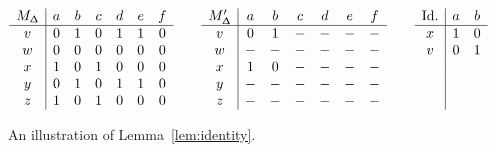 \documentclass{article}
\renewcommand{\Delta}{\Updelta}
\theoremstyle{plain}
\theoremstyle{definition}
\begin{document}
\begin{figure}[t]
       \vspace{-5pt}
       \begin{equation*}
            \begin{array}{c|cccccc}
                M_{\Delta} & a & b & c & d & e & f\\
                \hline v & 0 & 1 & 0 & 1 & 1 & 0\\
                w & 0 & 0 & 0 & 0 & 0 & 0\\
                x & 1 & 0 & 1 & 0 & 0 & 0\\
                y & 0 & 1 & 0 & 1 & 1 & 0\\
                z & 1 & 0 & 1 & 0 & 0 & 0
            \end{array}
            \qquad
            \begin{array}{c|cccccc}
                M'_{\Delta} & a & b & c & d & e & f\\
                \hline v & 0 & 1 & - & - & - & -\\
                w & - & - & - & - & - & -\\
                x & 1 & 0 & - & - & - & -\\
                y & - & - & - & - & - & -\\
                z & - & - & - & - & - & -
            \end{array}
            \qquad
            \begin{array}{c|cc}
                \textup{{Id.}} & a & b\\
                \hline x & 1 & 0\\
                v & 0 & 1\\
                \\
                \\
                \\
            \end{array}
        \end{equation*}
        \caption{\label{fig:identity}An illustration of Lemma~\ref{lem:identity}.\\~}
\end{figure}
\end{document}

